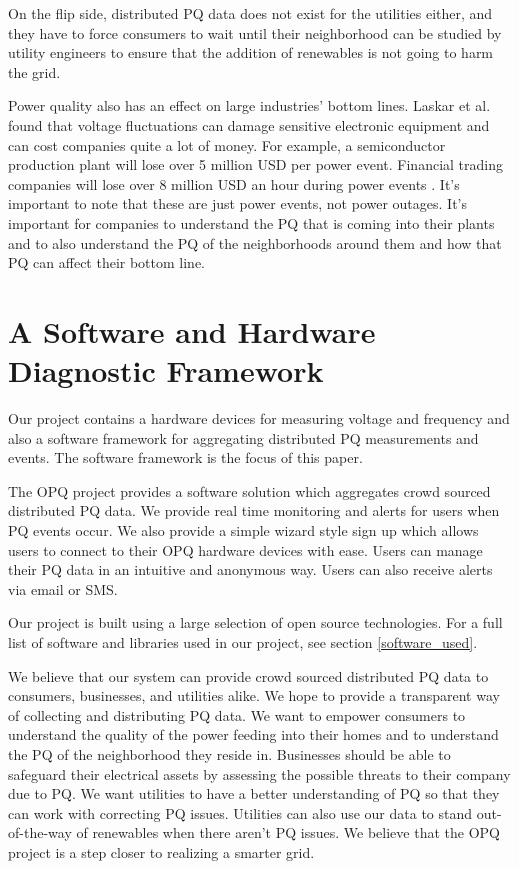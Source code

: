 \documentclass[11pt]{article}
\begin{document}
On the flip side, distributed PQ data does not exist for the utilities either, and they have to force consumers to wait until their neighborhood can be studied by utility engineers to ensure that the addition of renewables is not going to harm the grid.

Power quality also has an effect on large industries' bottom lines. Laskar et al. found that voltage fluctuations can damage sensitive electronic equipment and can cost companies quite a lot of money. For example, a semiconductor production plant will lose over 5 million USD per power event. Financial trading companies will lose over 8 million USD an hour during power events \cite{Laskar}. It's important to note that these are just power events, not power outages. It's important for companies to understand the PQ that is coming into their plants and to also understand the PQ of the neighborhoods around them and how that PQ can affect their bottom line.

\section{A Software and Hardware Diagnostic Framework}
Our project contains a hardware devices for measuring voltage and frequency and also a software framework for aggregating distributed PQ measurements and events. The software framework is the focus of this paper.

The OPQ project provides a software solution which aggregates crowd sourced distributed PQ data. We provide real time monitoring and alerts for users when PQ events occur. We also provide a simple wizard style sign up which allows users to connect to their OPQ hardware devices with ease. Users can manage their PQ data in an intuitive and anonymous way. Users can also receive alerts via email or SMS.

Our project is built using a large selection of open source technologies. For a full list of software and libraries used in our project, see section \ref{software_used}. 

We believe that our system can provide crowd sourced distributed PQ data to consumers, businesses, and utilities alike. We hope to provide a transparent way of collecting and distributing PQ data. We want to empower consumers to understand the quality of the power feeding into their homes and to understand the PQ of the neighborhood they reside in. Businesses should be able to safeguard their electrical assets by assessing the possible threats to their company due to PQ. We want utilities to have a better understanding of PQ so that they can work with correcting PQ issues. Utilities can also use our data to stand out-of-the-way of renewables when there aren't PQ issues. We believe that the OPQ project is a step closer to realizing a smarter grid.
\end{document}
